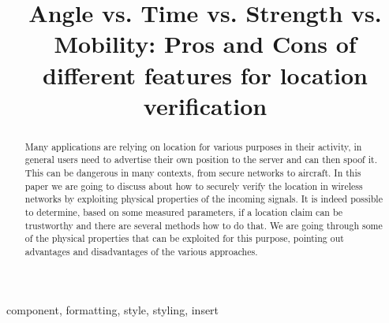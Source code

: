 \documentclass[conference]{IEEEtran}
\begin{document}
\title{Angle vs. Time vs. Strength vs. Mobility: Pros and Cons of different features for location verification}


\maketitle

\begin{abstract}
    Many applications are relying on location for various purposes in their activity, in general users need to advertise their own position to the server and can then spoof it. This can be dangerous in many contexts, from secure networks to aircraft. In this paper we are going to discuss about how to securely verify the location in wireless networks by exploiting physical properties of the incoming signals. It is indeed possible to determine, based on some measured parameters, if a location claim can be trustworthy and there are several methods how to do that. We are going through some of the physical properties that can be exploited for this purpose, pointing out advantages and disadvantages of the various approaches.
\end{abstract}

\begin{IEEEkeywords}
component, formatting, style, styling, insert
\end{IEEEkeywords}
\end{document}
